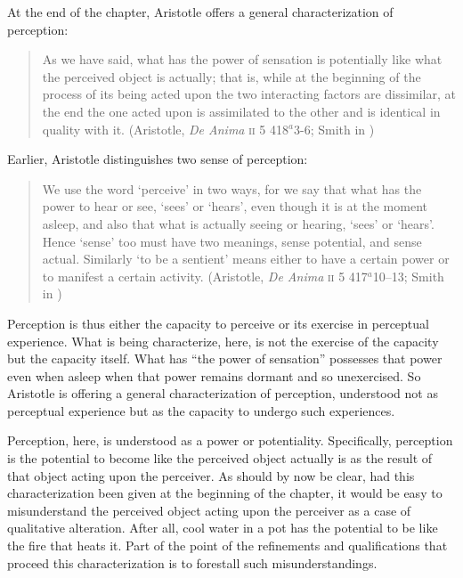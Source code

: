 At the end of the chapter, Aristotle offers a general characterization of perception:
\begin{quote}
	As we have said, what has the power of sensation is potentially like what the perceived object is actually; that is, while at the beginning of the process of its being acted upon the two interacting factors are dissimilar, at the end the one acted upon is assimilated to the other and is identical in quality with it. (Aristotle, \emph{De Anima} \textsc{ii} 5 418\( ^{a} \)3-6; Smith in \citealt[31]{Barnes:1984uq})
\end{quote}
Earlier, Aristotle distinguishes two sense of perception:
\begin{quote}
	We use the word `perceive' in two ways, for we say that what has the power to hear or see, `sees' or `hears', even though it is at the moment asleep, and also that what is actually seeing or hearing, `sees' or `hears'. Hence `sense' too must have two meanings, sense potential, and sense actual. Similarly `to be a sentient' means either to have a certain power or to manifest a certain activity. (Aristotle, \emph{De Anima} \textsc{ii} 5 417\( ^{a} \)10--13; Smith in \citealt[19--30]{Barnes:1984uq})
\end{quote}
Perception is thus either the capacity to perceive or its exercise in perceptual experience. What is being characterize, here, is not the exercise of the capacity but the capacity itself. What has ``the power of sensation'' possesses that power even when asleep when that power remains dormant and so unexercised. So Aristotle is offering a general characterization of perception, understood not as perceptual experience but as the capacity to undergo such experiences. 

Perception, here, is understood as a power or potentiality. Specifically, perception is the potential to become like the perceived object actually is as the result of that object acting upon the perceiver. As should by now be clear, had this characterization been given at the beginning of the chapter, it would be easy to misunderstand the perceived object acting upon the perceiver as a case of qualitative alteration. After all, cool water in a pot has the potential to be like the fire that heats it. Part of the point of the refinements and qualifications that proceed this characterization is to forestall such misunderstandings. 

